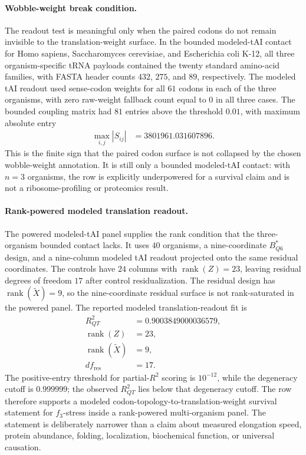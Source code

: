 \paragraph{Wobble-weight break condition.}
The readout test is meaningful only when the paired codons do not remain invisible to the translation-weight surface.  In the bounded modeled-tAI contact for Homo sapiens, Saccharomyces cerevisiae, and Escherichia coli K-12, all three organism-specific tRNA payloads contained the twenty standard amino-acid families, with FASTA header counts $432$, $275$, and $89$, respectively.  The modeled tAI readout used sense-codon weights for all $61$ codons in each of the three organisms, with zero raw-weight fallback count equal to $0$ in all three cases.  The bounded coupling matrix had $81$ entries above the threshold $0.01$, with maximum absolute entry
$$
\begin{aligned}
\max_{i,j}|S_{ij}|&=3801961.031607896.
\end{aligned}
$$
This is the finite sign that the paired codon surface is not collapsed by the chosen wobble-weight annotation.  It is still only a bounded modeled-tAI contact: with $n=3$ organisms, the row is explicitly underpowered for a survival claim and is not a ribosome-profiling or proteomics result.

\paragraph{Rank-powered modeled translation readout.}
The powered modeled-tAI panel supplies the rank condition that the three-organism bounded contact lacks.  It uses $40$ organisms, a nine-coordinate $B^{*}_{Q6}$ design, and a nine-column modeled tAI readout projected onto the same residual coordinates.  The controls have $24$ columns with $\operatorname{rank}(Z)=23$, leaving residual degrees of freedom $17$ after control residualization.  The residual design has $\operatorname{rank}(\widetilde X)=9$, so the nine-coordinate residual surface is not rank-saturated in the powered panel.  The reported modeled translation-readout fit is
$$
\begin{aligned}
 R^2_{QT}&=0.9003849000036579,\\
 \operatorname{rank}(Z)&=23,\\
 \operatorname{rank}(\widetilde X)&=9,\\
 df_{\mathrm{res}}&=17.
\end{aligned}
$$
The positive-entry threshold for partial-$R^2$ scoring is $10^{-12}$, while the degeneracy cutoff is $0.999999$; the observed $R^2_{QT}$ lies below that degeneracy cutoff.  The row therefore supports a modeled codon-topology-to-translation-weight survival statement for $f_3$-stress inside a rank-powered multi-organism panel.  The statement is deliberately narrower than a claim about measured elongation speed, protein abundance, folding, localization, biochemical function, or universal causation.

